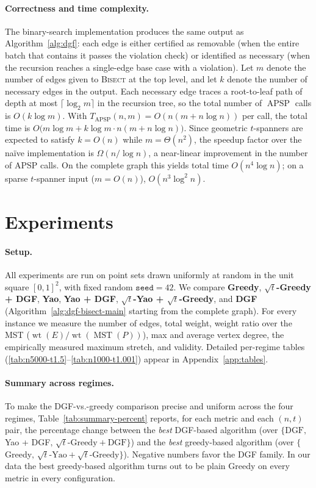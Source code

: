 \documentclass{cccg26}
\DeclareMathOperator{\wt}{wt}
\DeclareMathOperator{\MST}{MST}
\DeclareMathOperator{\APSP}{APSP}
\begin{document}
\paragraph{Correctness and time complexity.}
The binary-search implementation produces the same output as
Algorithm~\ref{alg:dgf}: each edge is either certified as removable
(when the entire batch that contains it passes the violation check) or
identified as necessary (when the recursion reaches a single-edge base
case with a violation). Let $m$ denote the number of edges given to
\textsc{Bisect} at the top level, and let $k$ denote the number of
necessary edges in the output. Each necessary edge traces a
root-to-leaf path of depth at most $\lceil\log_2 m\rceil$ in the
recursion tree, so the total number of $\APSP$ calls is $O(k\log m)$.
With $T_{\APSP}(n,m)=O(n(m+n\log n))$ per call, the total time is
$O\!\bigl(m\log m + k\log m\cdot n(m+n\log n)\bigr)$. Since geometric
$t$-spanners are expected to satisfy $k=O(n)$ while $m=\Theta(n^2)$,
the speedup factor over the na\"ive implementation is
$\Omega(n/\log n)$, a near-linear improvement in the number of APSP
calls. On the complete graph this yields total time
$O(n^4 \log n)$; on a sparse $t$-spanner input ($m=O(n)$),
$O(n^3 \log^2 n)$.

\section{Experiments}
\label{sec:experiments}

\paragraph{Setup.}
All experiments are run on point sets drawn uniformly at random in the
unit square $[0,1]^2$, with fixed random $\mathtt{seed}=42$. We
compare \textbf{Greedy}, \textbf{$\sqrt{t}$-Greedy + DGF},
\textbf{Yao}, \textbf{Yao + DGF}, \textbf{$\sqrt{t}$-Yao +
$\sqrt{t}$-Greedy}, and \textbf{DGF}
(Algorithm~\ref{alg:dgf-bisect-main} starting from the complete
graph). For every instance we measure the number of edges, total
weight, weight ratio over the MST ($\wt(E)/\wt(\MST(P))$), max
and average vertex degree, the empirically measured maximum stretch,
and validity. Detailed per-regime tables (\ref{tab:n5000-t1.5}--\ref{tab:n1000-t1.001})
appear in Appendix~\ref{app:tables}.

\paragraph{Summary across regimes.}
To make the DGF-vs.-greedy comparison precise and uniform across the
four regimes, Table~\ref{tab:summary-percent} reports, for each
metric and each $(n,t)$ pair, the percentage change between the
\emph{best} DGF-based algorithm (over $\{\text{DGF},\,$Yao + DGF$,\,
\sqrt{t}\text{-Greedy} + \text{DGF}\}$) and the \emph{best}
greedy-based algorithm (over $\{$Greedy$,\,\sqrt{t}\text{-Yao} +
\sqrt{t}\text{-Greedy}\}$). Negative numbers favor the DGF family.
In our data the best greedy-based algorithm turns out to be plain
Greedy on every metric in every configuration.
\end{document}
